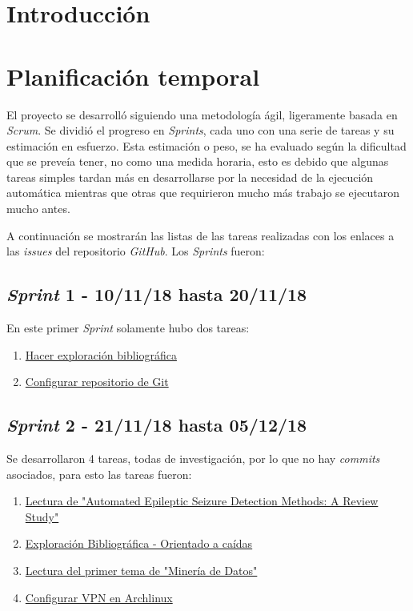 
\section{Introducción}

\section{Planificación temporal}

El proyecto se desarrolló siguiendo una metodología ágil, ligeramente basada en \textit{Scrum}. Se dividió el progreso en \textit{Sprints}, cada uno con una serie de tareas y su estimación en esfuerzo. Esta estimación o peso, se ha evaluado según la dificultad que se preveía tener, no como una medida horaria, esto es debido que algunas tareas simples tardan más en desarrollarse por la necesidad de la ejecución automática mientras que otras que requirieron mucho más trabajo se ejecutaron mucho antes.

A continuación se mostrarán las listas de las tareas realizadas con los enlaces a las \textit{issues} del repositorio \textit{GitHub}. Los \textit{Sprints} fueron:
\subsection{\textit{Sprint} 1 - 10/11/18 hasta 20/11/18}
En este primer \textit{Sprint} solamente hubo dos tareas:
\begin{enumerate}
	\item \href{https://github.com/joselucross/TFG-SmartBeds/issues/1}{Hacer exploración bibliográfica}
	\item \href{https://github.com/joselucross/TFG-SmartBeds/issues/2}{Configurar repositorio de Git}
\end{enumerate}
\subsection{\textit{Sprint} 2 - 21/11/18 hasta 05/12/18}
Se desarrollaron 4 tareas, todas de investigación, por lo que no hay \textit{commits} asociados, para esto las tareas fueron:

\begin{enumerate}\addtocounter{enumi}{2}
	\item \href{https://github.com/joselucross/TFG-SmartBeds/issues/3}{Lectura de "Automated Epileptic Seizure Detection Methods: A Review Study"}
	\item \href{https://github.com/joselucross/TFG-SmartBeds/issues/4}{Exploración Bibliográfica - Orientado a caídas}
	\item \href{https://github.com/joselucross/TFG-SmartBeds/issues/5}{ Lectura del primer tema de "Minería de Datos"}
	\item \href{https://github.com/joselucross/TFG-SmartBeds/issues/6}{ Configurar VPN en Archlinux}
\end{enumerate}

